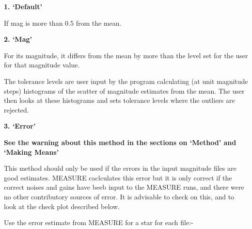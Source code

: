 \begin{small}
{{{ {\vspace*{2mm} \bf 1. \hspace{4ex} `Default'  \vspace*{2mm}}
 
   If mag is more than 0.5 from the mean.
 
 {\vspace*{2mm} \bf 2. \hspace{4ex} `Mag'  \vspace*{2mm}}
 
   For its magnitude, it differs from the mean by more than
   the level set for the user for that magnitude value.
 
              The tolerance levels are user input by the program
              calculating (at unit magnitude steps) histograms  of the
              scatter of magnitude estimates from the mean. The user
              then looks at these histograms and sets tolerance levels
              where the outliers are rejected.
 
 {\vspace*{2mm} \bf 3. \hspace{4ex} `Error'  \vspace*{2mm}}
 
{\bf See the warning about this method in the sections on `Method'
     and `Making Means'}
 
      This method should only be used if the errors in the input
      magnitude files are good estimates. MEASURE caclculates this
      error but it is only correct if the correct noises and gains
      have beeb input to the MEASURE runs, and there were no other
      contributory sources of error. It is advisable to check on
      this, and to look at the check plot described below.
 
              Use the error estimate from MEASURE for a star for each
              file:-
 
}}}
\end{small}
